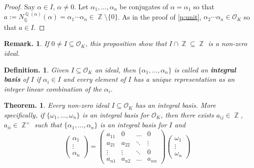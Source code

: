 \documentclass[11pt, a4paper]{memoir}
\DeclareMathOperator{\Q}{{\mathbb{Q}}}
\DeclareMathOperator{\Z}{{\mathbb{Z}}}
\theoremstyle{change}
\newtheorem{theorem}{Theorem.}[section]
\theoremstyle{plain}
\theoremstyle{nonumberplain}
\newtheorem{definition}{Definition.}
\newtheorem{remark}{Remark.}
\newtheorem{proof}{Proof}
\newcommand{\mbf}[1]{{\boldmath\bfseries #1}}
\numberwithin{equation}{section}
\begin{document}
\begin{proof}
    Say $\alpha\in I$, $\alpha\neq 0$.
    Let $\alpha_1,\ldots,\alpha_n$ be conjugates of $\alpha=\alpha_1$ so that $a:=N_{\Q}^{\Q(\alpha)}(\alpha)=\alpha_1\cdots\alpha_n\in\Z\setminus\{0\}$.
    As in the proof of \cref{p:unit}, $\alpha_2\cdots\alpha_n\in\mathcal{O}_K$ so that $a\in I$.
\end{proof}
\begin{remark}
    If $0\neq I\subseteq\mathcal{O}_K$, this proposition show that $I\cap\Z\subseteq\Z$ is a non-zero ideal.
\end{remark}
\begin{definition}
    Given $I\subseteq\mathcal{O}_K$ an ideal, then $\{\alpha_1,\ldots,\alpha_n\}$ is called an \mbf{integral basis} of $I$ if $\alpha_i\in I$ and every element of $I$ has a unique representation as an integer linear combination of the $\alpha_i$.
\end{definition}
\begin{theorem}\label{t:id-basis}
    Every non-zero ideal $I\subseteq\mathcal{O}_K$ has an integral basis.
    More specifically, if $\{\omega_1,\ldots,\omega_n\}$ is an integral basis for $\mathcal{O}_K$, then there exists $a_{ij}\in\Z$, $a_{ii}\in\Z^+$ such that $\{\alpha_1,\ldots,\alpha_n\}$ is an integral basis for $I$ and
    \begin{equation*}
        \begin{pmatrix}
            \alpha_1\\\vdots\\\alpha_n
        \end{pmatrix}
        =
        \begin{pmatrix}
            a_{11}&0&\hdots&0\\
            a_{21}&a_{22}&\ddots&\vdots\\
            \vdots&\vdots&\ddots&0\\
            a_{n1}&a_{n2}&\hdots&a_{nn}
        \end{pmatrix}
        \begin{pmatrix}
            \omega_1\\\vdots\\\omega_n
        \end{pmatrix}
    \end{equation*}
\end{theorem}
\end{document}
